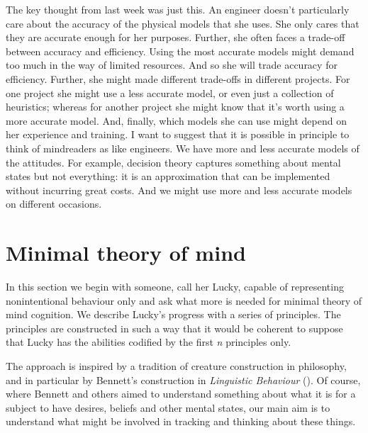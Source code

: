 \documentclass[12pt,\papersize]{extarticle}
\begin{document}
The key thought from last week was just this.
An engineer doesn’t particularly care about the accuracy of the physical models that she uses.
She only cares that they are accurate enough for her purposes.
Further, she often faces a trade-off between accuracy and efficiency.  
Using the most accurate models might demand too much in the way of limited resources.
And so she will trade accuracy for efficiency.
Further, she might made different trade-offs in different projects.
For one project she might use a less accurate model, 
or even just a collection of heuristics;
whereas for another project she might know that it’s worth using a more accurate model.
And, finally, which models she can use might depend on her experience and training.
I want to suggest that it is possible in principle to think of mindreaders as like engineers.
We have more and less accurate models of the attitudes.
For example, decision theory captures something about mental states but not everything: it is an approximation that can be implemented without incurring great costs.
And we might use more and less accurate models on different occasions.


\section{Minimal theory of mind}
\label{sec:minimal}
In this section we begin with someone, call her Lucky, capable  of representing nonintentional behaviour only and ask what more is needed for minimal theory of mind cognition.  We describe Lucky’s progress with a series of principles. The principles are constructed in such a way that it would be coherent to suppose that Lucky has the abilities codified by the first \textit{n} principles only.

The approach is inspired by a tradition of creature construction in philosophy, and in particular by Bennett’s construction in \textit{Linguistic Behaviour} (\citeyear{Bennett:1976rg}).  Of course, where Bennett and others aimed to understand something about what it is for a subject to have desires, beliefs and other mental states, our main aim is to understand what might be involved in tracking and thinking about these things.
\end{document}
